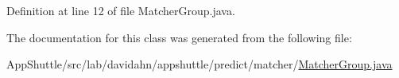 \-Definition at line 12 of file \-Matcher\-Group.\-java.



\-The documentation for this class was generated from the following file\-:\begin{DoxyCompactItemize}
\item 
\-App\-Shuttle/src/lab/davidahn/appshuttle/predict/matcher/\hyperlink{_matcher_group_8java}{\-Matcher\-Group.\-java}\end{DoxyCompactItemize}
